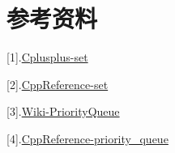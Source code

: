 \documentclass{article}
\begin{document}
    \section*{参考资料}

    [1].\href{https://cplusplus.com/reference/set/set/}{Cplusplus-set}

    [2].\href{https://en.cppreference.com/w/cpp/container/set}{CppReference-set}

    [3].\href{https://en.wikipedia.org/wiki/Priority_queue}{Wiki-PriorityQueue}

    [4].\href{https://en.cppreference.com/w/cpp/container/priority_queue}{CppReference-priority\_queue}
    
\end{document}
